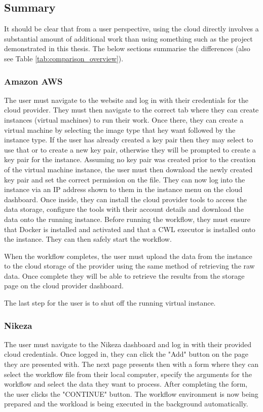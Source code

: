 \subsection{Summary}

It should be clear that from a user perspective, using the cloud directly involves a substantial amount of additional work than using something such as the project demonstrated in this thesis. The below sections summarise the differences (also see Table \ref{tab:comparison_overview}).

\subsubsection{Amazon AWS}
The user must navigate to the website and log in with their credentials for the cloud provider. They must then navigate to the correct tab where they can create instances (virtual machines) to run their work. Once there, they can create a virtual machine by selecting the image type that hey want followed by the instance type. If the user has already created a key pair then they may select to use that or to create a new key pair, otherwise they will be prompted to create a key pair for the instance. Assuming no key pair was created prior to the creation of the virtual machine instance, the user must then download the newly created key pair and set the correct permission on the file. They can now log into the instance via an IP address shown to them in the instance menu on the cloud dashboard. Once inside, they can install the cloud provider tools to access the data storage, configure the tools with their account details and download the data onto the running instance. Before running the workflow, they must ensure that Docker is installed and activated and that a CWL executor is installed onto the instance. They can then safely start the workflow.

When the workflow completes, the user must upload the data from the instance to the cloud storage of the provider using the same method of retrieving the raw data. Once complete they will be able to retrieve the results from the storage page on the cloud provider dashboard.

The last step for the user is to shut off the running virtual instance.

\subsubsection{Nikeza}
The user must navigate to the Nikeza dashboard and log in with their provided cloud credentials. Once logged in, they can click the "Add" button on the page they are presented with. The next page presents then with a form where they can select the workflow file from their local computer, specify the arguments for the workflow and select the data they want to process. After completing the form, the user clicks the "CONTINUE" button. The workflow environment is now being prepared and the workload is being executed in the background automatically.

